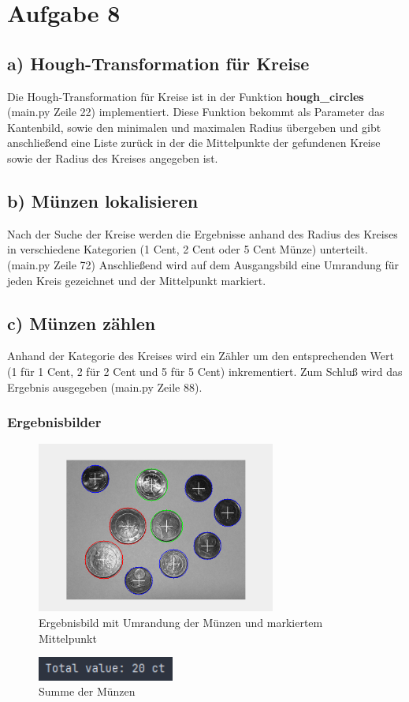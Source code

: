 \documentclass[12pt]{article}
\begin{document}

\section*{Aufgabe 8}
\subsection*{a) Hough-Transformation für Kreise}
Die Hough-Transformation für Kreise ist in der Funktion \textbf{hough\_circles} (main.py Zeile 22) implementiert.
Diese Funktion bekommt als Parameter das Kantenbild, sowie den minimalen und maximalen Radius übergeben und gibt anschließend eine Liste zurück in der die Mittelpunkte der gefundenen Kreise sowie der Radius des Kreises angegeben ist.

\subsection*{b) Münzen lokalisieren}
Nach der Suche der Kreise werden die Ergebnisse anhand des Radius des Kreises in verschiedene Kategorien (1 Cent, 2 Cent oder 5 Cent Münze) unterteilt. (main.py Zeile 72)
Anschließend wird auf dem Ausgangsbild eine Umrandung für jeden Kreis gezeichnet und der Mittelpunkt markiert.

\subsection*{c) Münzen zählen}
Anhand der Kategorie des Kreises wird ein Zähler um den entsprechenden Wert (1 für 1 Cent, 2 für 2 Cent und 5 für 5 Cent) inkrementiert. Zum Schluß wird das Ergebnis ausgegeben (main.py Zeile 88).

\subsubsection*{Ergebnisbilder}
\begin{figure}[H]
  \centering
  \includegraphics[width=0.7\textwidth, keepaspectratio]{hough.png}\\
  Ergebnisbild mit Umrandung der Münzen und markiertem Mittelpunkt 
\end{figure}
\begin{figure}[H]
  \centering
  \includegraphics[width=0.4\textwidth, keepaspectratio]{total.png}\\
  Summe der Münzen
\end{figure}
\end{document}
